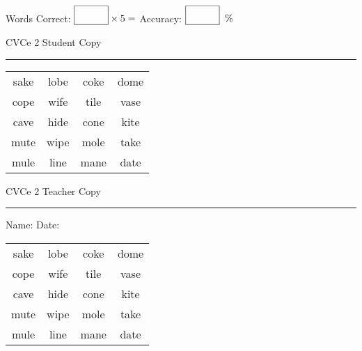 \documentclass{memoir}
\begin{document}
\small

Words Correct: $\fbox{\phantom{\huge 100}} \times 5 = $ Accuracy: $\fbox{\phantom{\huge 100}}\;\; \%$ 

\vfill

\newpage


\footnotesize \noindent
CVCe 2 \hfill Student Copy
\smallskip
\hrule

\Large

\setlength{\tabcolsep}{14pt}
\def\arraystretch{2}

{\selectfont


\begin{vplace}[0.5]
\begin{center}
\begin{tabular}{cccc}
sake & lobe & coke & dome \\
cope & wife & tile & vase \\
cave & hide & cone & kite \\
mute & wipe & mole & take \\
mule & line & mane & date \\
\end{tabular}
\end{center}
\end{vplace}

}

\newpage

\footnotesize \noindent
CVCe 2 \hfill Teacher Copy
\smallskip
\hrule

\small

\vfill

\noindent
Name: \underline{\hspace{1.75in}} \hfill Date: \underline{\hspace{1in}}

\Large

{\selectfont


\begin{vplace}[0.5]
\begin{center}
\begin{tabular}{cccc}
sake & lobe & coke & dome \\
cope & wife & tile & vase \\
cave & hide & cone & kite \\
mute & wipe & mole & take \\
mule & line & mane & date \\
\end{tabular}
\end{center}
\end{vplace}



}
\end{document}
